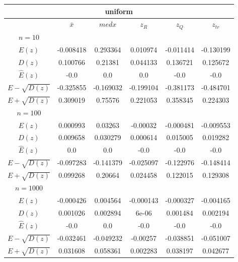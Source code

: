 \begin{tabular}{|c | c | c | c | c | c|} 
 \hline \multicolumn{6}{|c|}{uniform} \\ 
 \hline & $\bar{x}$ & $medx$ & $z_R$ & $z_Q$ & $z_{tr}$ 
 \\ \hline $n=10$ & & & & & \\ 
 \hline $E(z)$ 
 &-0.008418 &0.293364 &0.010974 &-0.011414 &-0.130199 \\ 
 \hline $D(z)$ 
 &0.100766 &0.21381 &0.044133 &0.136721 &0.125672 \\ 
\hline $\hat{E}(z)$ 
&-0.0&0.0&0.0&-0.0&-0.0 \\ 
\hline $E-\sqrt{D(z)}$ 
&-0.325855&-0.169032&-0.199104&-0.381173&-0.484701 \\ 
\hline $E+\sqrt{D(z)}$ 
&0.309019&0.75576&0.221053&0.358345&0.224303 \\ \hline $n=100$ & & & & & \\ 
 \hline $E(z)$ 
 &0.000993 &0.03263 &-0.00032 &-0.000481 &-0.009553 \\ 
 \hline $D(z)$ 
 &0.009658 &0.030279 &0.000614 &0.015005 &0.019282 \\ 
\hline $\hat{E}(z)$ 
&0.0&0.0&-0.0&-0.0&-0.0 \\ 
\hline $E-\sqrt{D(z)}$ 
&-0.097283&-0.141379&-0.025097&-0.122976&-0.148414 \\ 
\hline $E+\sqrt{D(z)}$ 
&0.099268&0.20664&0.024458&0.122015&0.129308 \\ \hline $n=1000$ & & & & & \\ 
 \hline $E(z)$ 
 &-0.000426 &0.004564 &-0.000143 &-0.000327 &-0.004165 \\ 
 \hline $D(z)$ 
 &0.001026 &0.002894 &6e-06 &0.001484 &0.002194 \\ 
\hline $\hat{E}(z)$ 
&-0.0&0.0&-0.0&-0.0&-0.0 \\ 
\hline $E-\sqrt{D(z)}$ 
&-0.032461&-0.049232&-0.00257&-0.038851&-0.051007 \\ 
\hline $E+\sqrt{D(z)}$ 
&0.031608&0.058361&0.002283&0.038197&0.042677 \\ \hline 
 \end{tabular}